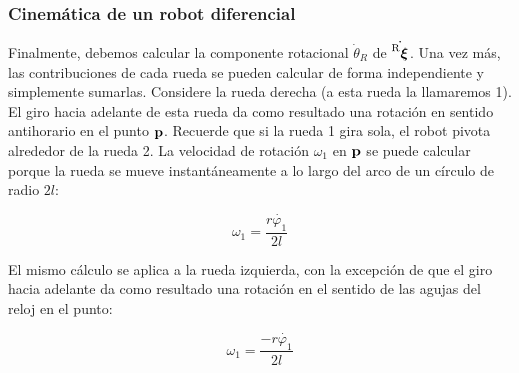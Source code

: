 \begin{frame}
    \frametitle{Cinemática de un robot diferencial}
    \small

    Finalmente, debemos calcular la componente rotacional $\dot{\theta}_{R}$ de $\dot{\prescript{\mathrm{R}}{}{{\boldsymbol{\mathbf{\xi}}}_\mathrm{}}}$. Una vez más, las contribuciones de cada rueda se pueden calcular de forma independiente y simplemente sumarlas. Considere la rueda derecha (a esta rueda la llamaremos 1). El giro hacia adelante de esta rueda da como resultado una rotación en sentido antihorario en el punto $\boldsymbol{\mathbf{p}}$. Recuerde que si la rueda 1 gira sola, el robot pivota alrededor de la rueda 2. La velocidad de rotación $\omega_{1}$ en $\boldsymbol{\mathbf{p}}$ se puede calcular porque la rueda se mueve instantáneamente a lo largo del arco de un círculo de radio $2l$:

    \begin{equation*}
        \omega_{1} = \dfrac{r\dot{\varphi_{1}}}{2l}
    \end{equation*}

    El mismo cálculo se aplica a la rueda izquierda, con la excepción de que el giro hacia adelante da como resultado una rotación en el sentido de las agujas del reloj en el punto:

    \begin{equation*}
        \omega_{1} = \dfrac{-r\dot{\varphi_{1}}}{2l}
    \end{equation*}
\end{frame}